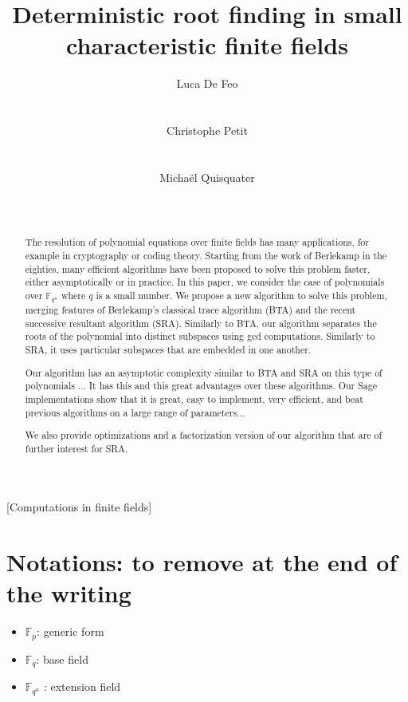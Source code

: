 \documentclass{sig-alternate}
\author{
  \alignauthor Luca De Feo\\
  \affaddr{Laboratoire PRiSM}\\
  \affaddr{Universit\'e de Versailles}\\
  \email{luca.de-feo@uvsq.fr}
  \alignauthor Christophe Petit\\
  \affaddr{Crypto Group}\\
  \affaddr{University College London}\\
  \email{}
  \alignauthor Micha\"el Quisquater\\
  \affaddr{Laboratoire PRiSM}\\
  \affaddr{Universit\'e de Versailles}\\
  \email{mquis@prism.uvsq.fr}
}
\title{Deterministic root finding in small characteristic finite
  fields}
\newcommand{\ff}[1]{\mathbb{F}_{#1}}
\newcommand{\fq}{\ff{q}}
\newcommand{\fqn}{\ff{q^n}}
\newcounter{algo}
\begin{document}
\maketitle
\begin{abstract}
  The resolution of polynomial equations over finite fields has many
  applications, for example in cryptography or coding theory. Starting
  from the work of Berlekamp in the eighties, many efficient
  algorithms have been proposed to solve this problem faster, either
  asymptotically or in practice.  In this paper, we consider the case
  of polynomials over $\fqn$ where $q$ is a small number. We propose a
  new algorithm to solve this problem, merging features of Berlekamp's
  classical trace algorithm (BTA) and the recent successive resultant
  algorithm (SRA).  Similarly to BTA, our algorithm separates the
  roots of the polynomial into distinct subspaces using gcd
  computations. Similarly to SRA, it uses particular subspaces that
  are embedded in one another.

  Our algorithm has an asymptotic complexity similar to BTA and SRA on
  this type of polynomials ... It has this and this great advantages
  over these algorithms. Our Sage implementations show that it is
  great, easy to implement, very efficient, and beat previous
  algorithms on a large range of parameters...

  We also provide optimizations and a factorization version of our
  algorithm that are of further interest for SRA.
\end{abstract}

[Computations in finite fields]



\section*{Notations: to remove at the end of the writing}


\begin{itemize}
\item $\ff{p}$: generic form
\item $\fq$: base field 
\item  $\fqn$ : extension field  
\end{itemize}
\end{document}
